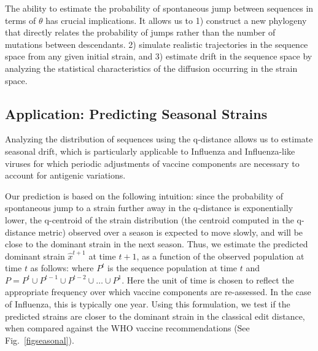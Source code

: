 {The ability to estimate the probability of spontaneous jump between sequences in terms of $\theta$ has  crucial implications. It allows us to 1) construct  a new  phylogeny that directly relates the probability of jumps rather than the number of mutations  between descendants. 2) simulate realistic trajectories in the sequence space from any given initial strain, and 3) estimate drift in the sequence space  by analyzing the statistical characteristics of the diffusion occurring in the strain space.





\subsection*{Application: Predicting Seasonal Strains}

Analyzing the distribution of sequences using the q-distance allows us to estimate seasonal drift, which is particularly applicable to Influenza and Influenza-like viruses for which periodic adjustments of vaccine components are necessary to account for antigenic variations. 

Our prediction is based on the following intuition: since the probability of spontaneous jump to a strain further away in the q-distance is exponentially lower, the q-centroid of the strain distribution (the centroid computed in the q-distance metric) observed over a season is expected to move slowly, and will be close to the dominant strain in the next season. Thus, we estimate the predicted dominant strain $\widehat{x}^{t+1}$ at time $t+1$, as a function of the observed population at time $t$ as follows:
%
where $P^t$ is the sequence population at time $t$ and $P = P^t \cup P^{t-1} \cup P^{t-2} \cup \dots \cup P^1$. Here the unit of time is chosen to reflect the appropriate frequency over which vaccine components are re-assessed. In the case of Influenza, this is typically one year. Using this formulation, we  test if the predicted strains are  closer to the  dominant strain in the classical edit distance, when compared against the WHO vaccine recommendations (See Fig.~\ref{figseasonal}).
}